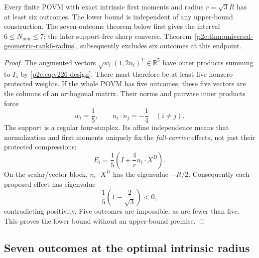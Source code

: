 \documentclass[12pt,a4paper]{article}
\begin{document}
\begin{corollary}
\label{p2c:cor:v226-five}
Every finite POVM with exact intrinsic first moments and radius
$r=\sqrt3R$ has at least six outcomes. The lower bound is independent
of any upper-bound construction. The seven-outcome theorem below first gives the interval
$6\le N_{\min}\le7$; the later support-free sharp converse,
Theorem~\ref{p2c:thm:universal-geometric-rank6-radius},
subsequently excludes six outcomes at this endpoint.
\end{corollary}
\begin{proof}
The augmented vectors $\sqrt{w_i}(1,2n_i)^T\in\mathbb{R}^5$ have outer products
summing to $I_5$ by \eqref{p2c:eq:v226-design}. There must therefore be at least
five nonzero protected weights. If the whole POVM has five outcomes,
these five vectors are the columns of an orthogonal matrix. Their norms
and pairwise inner products force
\[
 w_i=\frac15,\qquad n_i\cdot n_j=-\frac14\quad(i\ne j).
\]
The support is a regular four-simplex. Its affine independence means that
normalization and first moments uniquely fix the \emph{full-carrier}
effects, not just their protected compressions:
\[
 E_i=\frac15\left(I+\frac4r n_i\cdot X^D\right).
\]
On the scalar/vector block, $n_i\cdot X^D$ has the eigenvalue $-R/2$.
Consequently each proposed effect has eigenvalue
\[
 \boxed{\frac15\left(1-\frac2{\sqrt3}\right)<0,}
\]
contradicting positivity. Five outcomes are impossible, as are fewer than
five. This proves the lower bound without an upper-bound premise.
\end{proof}

\subsection{Seven outcomes at the optimal intrinsic radius}
\label{p2c:sec:v255-seven-outcomes}
\end{document}
